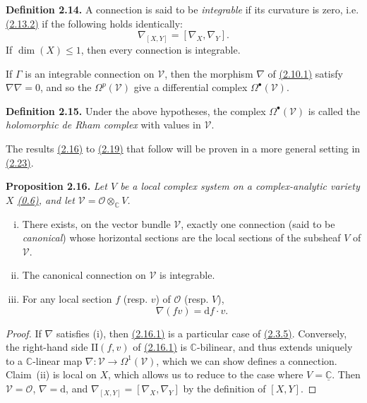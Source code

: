 \documentclass{report}
\newenvironment{itenv}[1]
  {\phantomsection\par\medskip\noindent\textbf{#1.}\itshape}
  {\medskip}
\newenvironment{rmenv}[1]
  {\phantomsection\par\medskip\noindent\textbf{#1.}\rmfamily}
  {\medskip}
\newcommand{\scr}[1]{{\mathscr{#1}}}
\renewcommand{\cal}[1]{{\mathcal{#1}}}
\newcommand{\CC}{\mathbb{C}}
\newcommand{\dd}{\mathrm{d}}
\newcommand{\II}{\mathrm{II}}
\renewcommand{\leq}{\leqslant}
\newcommand{\oldpage}[1]{\marginpar{\footnotesize$\Big\vert$ \textit{p.~#1}}}
\begin{document}
\begin{rmenv}{Definition 2.14}
\label{I.2.14}
  A connection is said to be \emph{integrable} if its curvature is zero, i.e. \hyperref[I.2.13.2]{(2.13.2)} if the following holds identically:
  \[
    \nabla_{[X,Y]} = [\nabla_X,\nabla_Y].
  \]
\end{rmenv}
If $\dim(X)\leq1$, then every connection is integrable.

If $\Gamma$ is an integrable connection on $\scr{V}$, then the morphism $\nabla$ of \hyperref[I.2.10.1]{(2.10.1)} satisfy $\nabla\nabla=0$, and so the $\Omega^p(\scr{V})$ give a differential complex $\Omega^\bullet(\scr{V})$.

\begin{rmenv}{Definition 2.15}
\label{I.2.15}
  Under the above hypotheses, the complex $\Omega^\bullet(\scr{V})$ is called the \emph{holomorphic de Rham complex} with values in $\scr{V}$.
\end{rmenv}

\oldpage{12}
The results \hyperref[I.2.16]{(2.16)} to \hyperref[I.2.19]{(2.19)} that follow will be proven in a more general setting in \hyperref[I.2.23]{(2.23)}.

\begin{itenv}{Proposition 2.16}
\label{I.2.16}
  Let $V$ be a local complex system on a complex-analytic variety $X$ \hyperref[0.6]{(0.6)}, and let $\scr{V}=\cal{O}\otimes_\CC V$.
  \begin{enumerate}[(i)]
    \item There exists, on the vector bundle $\scr{V}$, exactly one connection (said to be \emph{canonical}) whose horizontal sections are the local sections of the subsheaf $V$ of $\scr{V}$.
    \item The canonical connection on $\scr{V}$ is integrable.
    \item For any local section $f$ (resp. $v$) of $\cal{O}$ (resp. $V$),
      \[
      \label{I.2.16.1}
        \nabla(fv) = \dd f\cdot v.
      \tag{2.16.1}
      \]
  \end{enumerate}
\end{itenv}

\begin{proof}
  If $\nabla$ satisfies (i), then \hyperref[I.2.16.1]{(2.16.1)} is a particular case of \hyperref[I.2.3.5]{(2.3.5)}.
  Conversely, the right-hand side $\II(f,v)$ of \hyperref[I.2.16.1]{(2.16.1)} is $\CC$-bilinear, and thus extends uniquely to a $\CC$-linear map $\nabla\colon\scr{V}\to\Omega^1(\scr{V})$, which we can show defines a connection.
  Claim~(ii) is local on $X$, which allows us to reduce to the case where $V=\underline{\CC}$.
  Then $\scr{V}=\cal{O}$, $\nabla=\dd$, and $\nabla_{[X,Y]}=[\nabla_X,\nabla_Y]$ by the definition of $[X,Y]$.
\end{proof}
\end{document}
